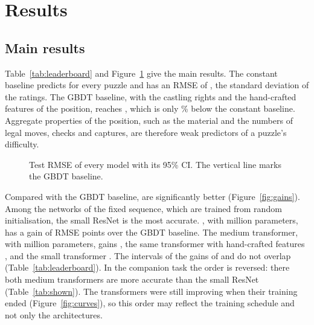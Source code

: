 \documentclass[11pt]{article}
\begin{document}


\section{Results}
\label{sec:results}

\subsection{Main results}

Table~\ref{tab:leaderboard} and Figure~\ref{fig:scores} give the main
results. The constant baseline predicts  for every puzzle
and has an RMSE of , the standard deviation of the ratings.
The GBDT baseline, with the castling rights and the 
hand-crafted features of the position, reaches , which is
only \% below the constant baseline. Aggregate
properties of the position, such as the material and the numbers of legal
moves, checks and captures, are therefore weak predictors of a puzzle's
difficulty.

\begin{table}[htbp]\centering\small
{}
\caption{Main results on the  test puzzles, best first.
The gain is the paired difference from  on the same
resampled games. It is positive when the model is better, and bold when
statistically significant.}
\label{tab:leaderboard}
\end{table}

\begin{figure}[htbp]\centering
{}
\caption{Test RMSE of every model with its 95\% CI. The vertical line marks
the GBDT baseline.}
\label{fig:scores}
\end{figure}

Compared with the GBDT baseline,  are significantly
better (Figure~\ref{fig:gains}). Among the networks of the fixed sequence,
which are trained from random initialisation, the small ResNet is the most
accurate. , with 
million parameters, has a gain of  RMSE points over
the GBDT baseline. The medium transformer, with
 million parameters, gains
, the same transformer with hand-crafted
features , and the small transformer
. The intervals of the gains of
 and  do not overlap
(Table~\ref{tab:leaderboard}).
\ifshown
In the companion task the order is reversed: there both medium transformers
are more accurate than the small ResNet (Table~\ref{tab:shown}).
\fi
The transformers were still improving when their training ended
(Figure~\ref{fig:curves}), so this order may reflect the training schedule
and not only the architectures.
\end{document}
